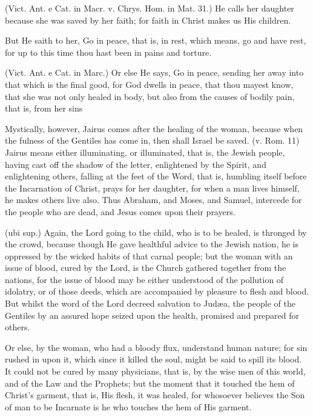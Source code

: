  (Vict. Ant. e Cat. in Macr. v. Chrys. Hom. in Mat. 31.) He calls her daughter because she was saved by her faith; for faith in Christ makes us His children.

 But He saith to her, Go in peace, that is, in rest, which means, go and have rest, for up to this time thou hast been in pains and torture.

 (Vict. Ant. e Cat. in Marc.) Or else He says, Go in peace, sending her away into that which is the final good, for God dwells in peace, that thou mayest know, that she was not only healed in body, but also from the causes of bodily pain, that is, from her sins

 Mystically, however, Jairus comes after the healing of the woman, because when the fulness of the Gentiles has come in, then shall Israel be saved. (v. Rom. 11) Jairus means either illuminating, or illuminated, that is, the Jewish people, having cast off the shadow of the letter, enlightened by the Spirit, and enlightening others, falling at the feet of the Word, that is, humbling itself before the Incarnation of Christ, prays for her daughter, for when a man lives himself, he makes others live also. Thus Abraham, and Moses, and Samuel, intercede for the people who are dead, and Jesus comes upon their prayers.

 (ubi sup.) Again, the Lord going to the child, who is to be healed, is thronged by the crowd, because though He gave healthful advice to the Jewish nation, he is oppressed by the wicked habits of that carnal people; but the woman with an issue of blood, cured by the Lord, is the Church gathered together from the nations, for the issue of blood may be either understood of the pollution of idolatry, or of those deeds, which are accompanied by pleasure to flesh and blood. But whilst the word of the Lord decreed salvation to Judæa, the people of the Gentiles by an assured hope seized upon the health, promised and prepared for others.

 Or else, by the woman, who had a bloody flux, understand human nature; for sin rushed in upon it, which since it killed the soul, might be said to spill its blood. It could not be cured by many physicians, that is, by the wise men of this world, and of the Law and the Prophets; but the moment that it touched the hem of Christ’s garment, that is, His flesh, it was healed, for whosoever believes the Son of man to be Incarnate is he who touches the hem of His garment.

